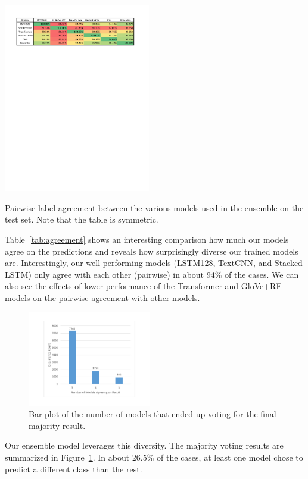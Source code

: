 \documentclass[10pt,conference,compsocconf]{IEEEtran}
\begin{document}
\begin{table}\centering
\includegraphics[width=0.48\textwidth]{./ensemble_tablev2}
\caption{Pairwise label agreement between the various models used in the ensemble on the test set. Note that the table is symmetric.}\label{tab:agreement}
\end{table}


Table~\ref{tab:agreement} shows an interesting comparison how much our models agree on the predictions and reveals how surprisingly diverse our trained models are.
Interestingly, our well  performing models (LSTM128, TextCNN, and Stacked LSTM) only agree with each other (pairwise) in about 94\% of the cases.
We can also see the effects of lower performance of the Transformer and GloVe+RF models on the pairwise agreement with other models.

\begin{figure}\centering
\includegraphics[width=0.48\textwidth]{./ensemble_diag}
\caption{Bar plot of the number of models that ended up voting for the final majority result.}\label{fig:diag}
\end{figure}

Our ensemble model leverages this diversity. The majority voting results are summarized in Figure~\ref{fig:diag}. In about 26.5\% of the cases, at least one model chose to predict a different class than the rest.
\end{document}
